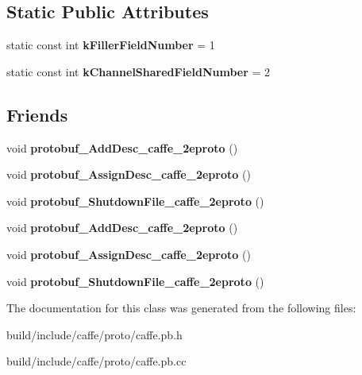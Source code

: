 \subsection*{Static Public Attributes}
\begin{DoxyCompactItemize}
\item 
\mbox{\label{classcaffe_1_1_p_re_l_u_parameter_a033b6b041c5a9e60b45ab36578077589}} 
static const int {\bfseries k\+Filler\+Field\+Number} = 1
\item 
\mbox{\label{classcaffe_1_1_p_re_l_u_parameter_aa202e5a868292db3097fdba8618618e3}} 
static const int {\bfseries k\+Channel\+Shared\+Field\+Number} = 2
\end{DoxyCompactItemize}
\subsection*{Friends}
\begin{DoxyCompactItemize}
\item 
\mbox{\label{classcaffe_1_1_p_re_l_u_parameter_a2670a9c8ffd0e5105cf7522cd6f8613d}} 
void {\bfseries protobuf\+\_\+\+Add\+Desc\+\_\+caffe\+\_\+2eproto} ()
\item 
\mbox{\label{classcaffe_1_1_p_re_l_u_parameter_a7f145bddbdde78003d27e42c7e003d23}} 
void {\bfseries protobuf\+\_\+\+Assign\+Desc\+\_\+caffe\+\_\+2eproto} ()
\item 
\mbox{\label{classcaffe_1_1_p_re_l_u_parameter_a026784a8e4e76f1b4daf9d033d2ece83}} 
void {\bfseries protobuf\+\_\+\+Shutdown\+File\+\_\+caffe\+\_\+2eproto} ()
\item 
\mbox{\label{classcaffe_1_1_p_re_l_u_parameter_a2670a9c8ffd0e5105cf7522cd6f8613d}} 
void {\bfseries protobuf\+\_\+\+Add\+Desc\+\_\+caffe\+\_\+2eproto} ()
\item 
\mbox{\label{classcaffe_1_1_p_re_l_u_parameter_a7f145bddbdde78003d27e42c7e003d23}} 
void {\bfseries protobuf\+\_\+\+Assign\+Desc\+\_\+caffe\+\_\+2eproto} ()
\item 
\mbox{\label{classcaffe_1_1_p_re_l_u_parameter_a026784a8e4e76f1b4daf9d033d2ece83}} 
void {\bfseries protobuf\+\_\+\+Shutdown\+File\+\_\+caffe\+\_\+2eproto} ()
\end{DoxyCompactItemize}


The documentation for this class was generated from the following files\+:\begin{DoxyCompactItemize}
\item 
build/include/caffe/proto/caffe.\+pb.\+h\item 
build/include/caffe/proto/caffe.\+pb.\+cc\end{DoxyCompactItemize}
